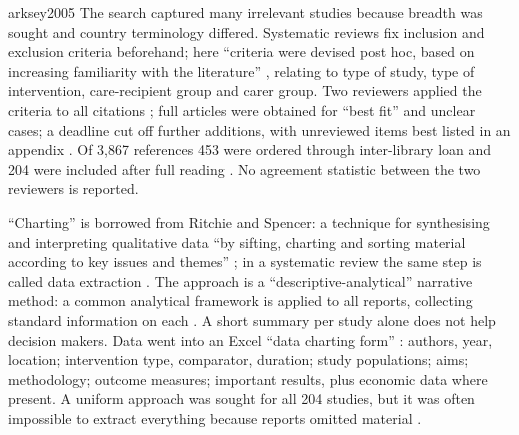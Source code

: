 \begin{papercard}{arksey2005}
 The search captured many irrelevant studies because breadth was sought and country terminology differed. Systematic reviews fix inclusion and exclusion criteria beforehand; here ``criteria were devised post hoc, based on increasing familiarity with the literature'' , relating to type of study, type of intervention, care-recipient group and carer group. Two reviewers applied the criteria to all citations ; full articles were obtained for ``best fit'' and unclear cases; a deadline cut off further additions, with unreviewed items best listed in an appendix . Of 3,867 references 453 were ordered through inter-library loan and 204 were included after full reading . No agreement statistic between the two reviewers is reported.

 ``Charting'' is borrowed from Ritchie and Spencer: a technique for synthesising and interpreting qualitative data ``by sifting, charting and sorting material according to key issues and themes'' ; in a systematic review the same step is called data extraction . The approach is a ``descriptive-analytical'' narrative method: a common analytical framework is applied to all reports, collecting standard information on each . A short summary per study alone does not help decision makers. Data went into an Excel ``data charting form'' : authors, year, location; intervention type, comparator, duration; study populations; aims; methodology; outcome measures; important results, plus economic data where present. A uniform approach was sought for all 204 studies, but it was often impossible to extract everything because reports omitted material .


\end{papercard}
